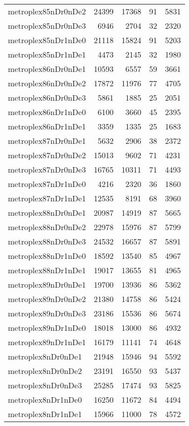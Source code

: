 \begin{longtable}{lrrrr}
metroplex85nDr0nDe2 & 24399 & 17368 & 91 & 5831 \\
metroplex85nDr0nDe3 & 6946 & 2704 & 32 & 2320 \\
metroplex85nDr1nDe0 & 21118 & 15824 & 91 & 5203 \\
metroplex85nDr1nDe1 & 4473 & 2145 & 32 & 1980 \\
metroplex86nDr0nDe1 & 10593 & 6557 & 59 & 3661 \\
metroplex86nDr0nDe2 & 17872 & 11976 & 77 & 4705 \\
metroplex86nDr0nDe3 & 5861 & 1885 & 25 & 2051 \\
metroplex86nDr1nDe0 & 6100 & 3660 & 45 & 2395 \\
metroplex86nDr1nDe1 & 3359 & 1335 & 25 & 1683 \\
metroplex87nDr0nDe1 & 5632 & 2906 & 38 & 2372 \\
metroplex87nDr0nDe2 & 15013 & 9602 & 71 & 4231 \\
metroplex87nDr0nDe3 & 16765 & 10311 & 71 & 4493 \\
metroplex87nDr1nDe0 & 4216 & 2320 & 36 & 1860 \\
metroplex87nDr1nDe1 & 12535 & 8191 & 68 & 3960 \\
metroplex88nDr0nDe1 & 20987 & 14919 & 87 & 5665 \\
metroplex88nDr0nDe2 & 22978 & 15976 & 87 & 5799 \\
metroplex88nDr0nDe3 & 24532 & 16657 & 87 & 5891 \\
metroplex88nDr1nDe0 & 18592 & 13540 & 85 & 4967 \\
metroplex88nDr1nDe1 & 19017 & 13655 & 81 & 4965 \\
metroplex89nDr0nDe1 & 19700 & 13936 & 86 & 5362 \\
metroplex89nDr0nDe2 & 21380 & 14758 & 86 & 5424 \\
metroplex89nDr0nDe3 & 23186 & 15536 & 86 & 5674 \\
metroplex89nDr1nDe0 & 18018 & 13000 & 86 & 4932 \\
metroplex89nDr1nDe1 & 16179 & 11141 & 74 & 4648 \\
metroplex8nDr0nDe1 & 21948 & 15946 & 94 & 5592 \\
metroplex8nDr0nDe2 & 23191 & 16550 & 93 & 5437 \\
metroplex8nDr0nDe3 & 25285 & 17474 & 93 & 5825 \\
metroplex8nDr1nDe0 & 16250 & 11672 & 84 & 4494 \\
metroplex8nDr1nDe1 & 15966 & 11000 & 78 & 4572 \\

\end{longtable}
